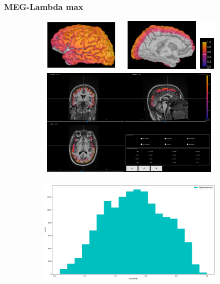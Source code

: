 \documentclass{beamer}
\numberwithin{figure}{section}
\numberwithin{equation}{section}
\begin{document}
\section{}
\begin{frame}
 \frametitle{MEG-Lambda max}
  

 	\begin{figure}[h]
        \begin{subfigure}[h]{0.53\linewidth} 
            \includegraphics[width=\linewidth]{pictures/meg3}
            \label{fig:rdf_graph}
        \end{subfigure}       
        \begin{subfigure}[h]{0.45\linewidth} 
            \includegraphics[width=\linewidth]{pictures/HISTmeg0.png}
            \label{fig:rdfs_graph}
        \end{subfigure}
    \end{figure}

  
\end{frame}
\end{document}
